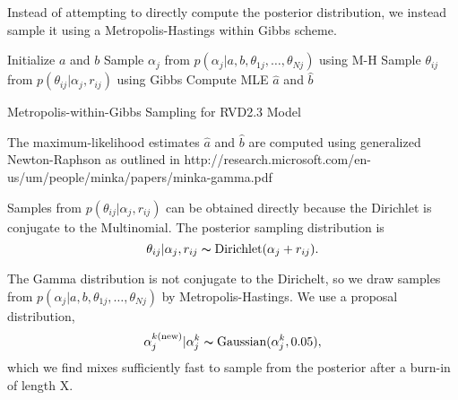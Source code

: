 \documentclass[10pt, letterpaper]{article}
\begin{document}
Instead of attempting to directly compute the posterior distribution, we instead sample it using  a Metropolis-Hastings within Gibbs scheme.

\begin{algorithm}[H]
\SetAlgoLined
{}
Initialize $a$ and $b$\;
 {
	Sample $\alpha_j$ from $p(\alpha_j | a, b, \theta_{1j}, \ldots, \theta_{Nj})$ using M-H\;
	Sample $\theta_{ij}$ from $p(\theta_{ij} | \alpha_j, r_{ij})$ using Gibbs\;
	Compute MLE $\hat{a}$ and $\hat{b}$
}
\caption{Metropolis-within-Gibbs Sampling for RVD2.3 Model}
\end{algorithm}

The maximum-likelihood estimates $\hat{a}$ and $\hat{b}$ are computed using generalized Newton-Raphson as outlined in http://research.microsoft.com/en-us/um/people/minka/papers/minka-gamma.pdf

Samples from $p(\theta_{ij} | \alpha_j, r_{ij})$ can be obtained directly because the Dirichlet is conjugate to the Multinomial. The posterior sampling distribution is
\begin{equation}
	\theta_{ij} | \alpha_j, r_{ij} \thicksim \text{Dirichlet}(\alpha_j + r_{ij}).
\end{equation}

The Gamma distribution is not conjugate to the Dirichelt, so we draw samples from $p(\alpha_j | a, b, \theta_{1j}, \ldots, \theta_{Nj})$ by Metropolis-Hastings. We use a proposal distribution,
\begin{equation}
	\alpha_j^{k \text{(new)}} | \alpha_j^k \thicksim \text{Gaussian}(\alpha_j^k, 0.05),
\end{equation}
which we find mixes sufficiently fast to sample from the posterior after a burn-in of length X.
	
\end{document}
